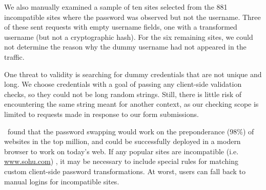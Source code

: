 We also manually examined a sample of ten sites selected from the 881 incompatible sites where the password was observed but not the username.  Three of these sent requests with empty username fields, one with a transformed username (but not a cryptographic hash).  For the six remaining sites, we could not determine the reason why the dummy username had not appeared in the traffic.




One threat to validity is searching for dummy credentials that are not unique and long. We choose credentials with a goal of passing any client-side validation checks, so they could not be long random strings. Still, there is little risk of encountering the same string meant for another context, as our checking scope is limited to requests made in response to our form submissions. 

\SwapScan\ found that the password swapping would work on the preponderance (98\%) of websites in the top million, and could be successfully deployed in a modern browser to work on today's web. If any popular sites are incompatible (i.e. \url{www.sohu.com}) %
, it may be necessary to include special rules for matching custom client-side password transformations. At worst, users can fall back to manual logins for incompatible sites.



